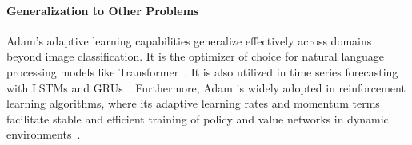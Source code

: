 \paragraph{Generalization to Other Problems}
Adam’s adaptive learning capabilities generalize effectively across domains beyond image classification. It is the optimizer of choice for natural language processing models like Transformer~\cite{vaswani2017attention}. It is also utilized in time series forecasting with LSTMs and GRUs~\cite{Makinde2024}. Furthermore, Adam is widely adopted in reinforcement learning algorithms, where its adaptive learning rates and momentum terms facilitate stable and efficient training of policy and value networks in dynamic environments~\cite{AsadiEtAl2023}.
